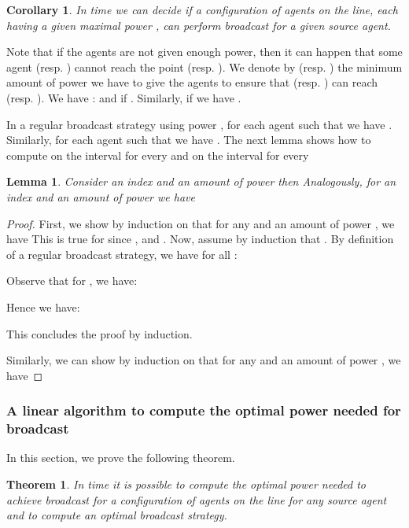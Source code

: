 \documentclass{article}
\newtheorem{lemma}{Lemma}
\newtheorem{theorem}{Theorem}
\newtheorem{corollary}{Corollary}
\newcommand\broadcast{broadcast\xspace}
\begin{document}
\begin{corollary}
In  time we can decide if a configuration  of  agents on the
line, each having a given maximal power , can perform
{\broadcast} for a given source agent.
\end{corollary}



Note that if the agents are not given enough power, then it can happen
that some agent   (resp. ) cannot reach the
point  (resp. ). We denote by
 (resp. ) the minimum amount of power  we have to give the agents
to ensure that  (resp. ) can reach  (resp. ). We have :  and if 
. 
Similarly, if  we have .


In a regular broadcast strategy using power , for each agent  such that  we have .
Similarly, for each agent  such that  we have .
The next lemma shows how to compute  on the interval 
 for every  and
 on the interval  for every 

\begin{lemma}\label{lem-eqn-reach-b}
Consider an index  and an amount of power 
 then 
Analogously, for an index  and an amount of 
power  we have 
\end{lemma}

\begin{proof}
First, we show by induction on  that for any  and an amount of power , we have 
This is true for  since ,  and .
Now, assume by induction that .
By definition of a regular broadcast strategy, we have for all :



Observe that for , we have: 

Hence we have:


This concludes the proof by induction.

Similarly, we can show by induction on  that for any  and an amount of power , we have 
\end{proof}

\subsubsection{A linear algorithm to compute the optimal power needed for
  {\broadcast}}  

In this section, we prove the following theorem. 

\begin{theorem}\label{thm:OptPower-b}
In  time it is possible to compute the optimal power needed to achieve broadcast for a configuration  of  agents on the line for any source agent and to compute an optimal broadcast strategy.
\end{theorem}
\end{document}

